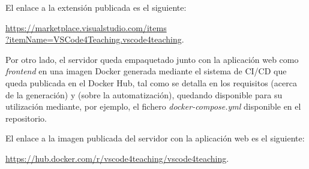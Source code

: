 \noindent El enlace a la extensión publicada es el siguiente:
\vspace{-0.7\baselineskip}
\begin{center}
    \href{https://marketplace.visualstudio.com/items?itemName=VSCode4Teaching.vscode4teaching}{https://marketplace.visualstudio.com/items\\ ?itemName=VSCode4Teaching.vscode4teaching}.
\end{center}
\vspace{-0.7\baselineskip}

Por otro lado, el servidor queda empaquetado junto con la aplicación web como \textit{frontend} en una imagen Docker generada mediante el sistema de CI/CD que queda publicada en el Docker Hub, tal como se detalla en los requisitos  (acerca de la generación) y  (sobre la automatización), quedando disponible para su utilización mediante, por ejemplo, el fichero \textit{docker-compose.yml} disponible en el repositorio.

\noindent El enlace a la imagen publicada del servidor con la aplicación web es el siguiente:
\vspace{-0.7\baselineskip}
\begin{center}
    \href{https://hub.docker.com/r/vscode4teaching/vscode4teaching}{https://hub.docker.com/r/vscode4teaching/vscode4teaching}.
\end{center}
\vspace{-0.7\baselineskip}
